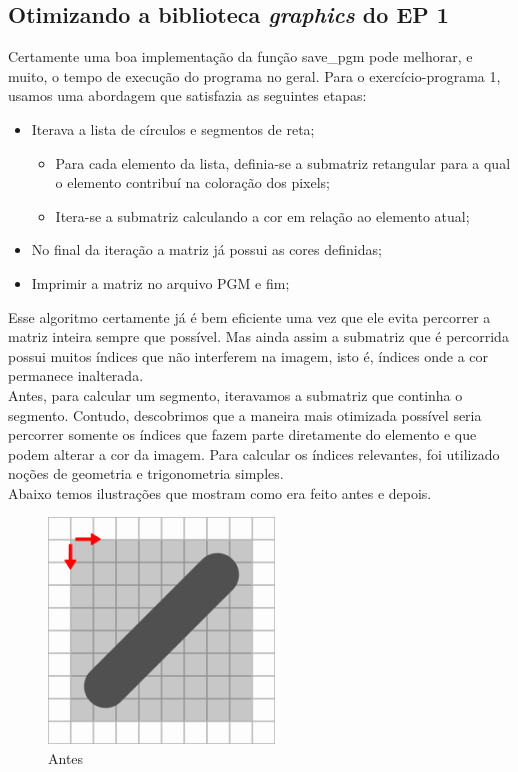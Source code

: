 \documentclass[12pt,a4paper]{article}
\begin{document}
	\subsection{Otimizando a biblioteca \textit{graphics} do EP 1}
	\indent Certamente uma boa implementação da função save\_pgm pode melhorar, e muito, o tempo de execução do programa no geral. Para o exercício-programa 1, usamos uma abordagem que satisfazia as seguintes etapas:
	\begin{itemize}
	\item Iterava a lista de círculos e segmentos de reta;
		\begin{itemize}
			\item Para cada elemento da lista, definia-se a submatriz retangular para a qual o elemento contribuí na coloração dos pixels;
			\item Itera-se a submatriz calculando a cor em relação ao elemento atual;
		\end{itemize}
	\item No final da iteração a matriz já possui as cores definidas;
	\item Imprimir a matriz no arquivo PGM e fim;
	\end{itemize}

	\indent Esse algoritmo certamente já é bem eficiente uma vez que ele evita percorrer a matriz inteira sempre que possível. Mas ainda assim a submatriz que é percorrida possui muitos índices que não interferem na imagem, isto é, índices onde a cor permanece inalterada.\\
	\indent Antes, para calcular um segmento, iteravamos a submatriz que continha o segmento. Contudo, descobrimos que a maneira mais otimizada possível seria percorrer somente os índices que fazem parte diretamente do elemento e que podem alterar a cor da imagem. Para calcular os índices relevantes, foi utilizado noções de geometria e trigonometria simples.\\
	\indent Abaixo temos ilustrações que mostram como era feito antes e depois.

	\begin{figure}[h!]
		\centering
		\includegraphics[height=6cm,keepaspectratio]{seg_antes.png}
		\caption{Antes}
	\end{figure}
\end{document}
